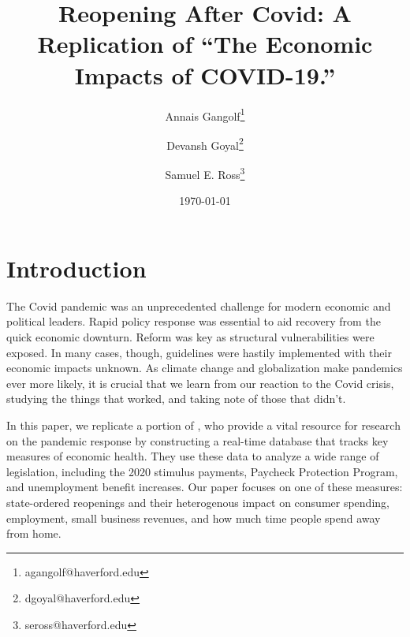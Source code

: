 \documentclass[12pt,letterpaper]{article}
\title{Reopening After Covid: A Replication of \authorcite{Chetty2020} ``The Economic Impacts of COVID-19.''}
\author[1]{Annais Gangolf\thanks{agangolf@haverford.edu}}
\author[1]{Devansh Goyal\thanks{dgoyal@haverford.edu}}
\author[1]{Samuel E. Ross\thanks{seross@haverford.edu}}
\affil[1]{Economics Research Club, Haverford College, Haverford, PA 19041, USA}
\date{\today}
\begin{document}
\maketitle

\abstract{
}

\section*{Introduction}
The Covid pandemic was an unprecedented challenge for modern economic and political leaders. Rapid policy response was essential to aid recovery from the quick economic downturn. Reform was key as structural vulnerabilities were exposed. In many cases, though, guidelines were hastily implemented with their economic impacts unknown. As climate change and globalization make pandemics ever more likely, it is crucial that we learn from our reaction to the Covid crisis, studying the things that worked, and taking note of those that didn’t.

In this paper, we replicate a portion of \textcite{Chetty2020}, who provide a vital resource for research on the pandemic response by constructing a real-time database that tracks key measures of economic health. They use these data to analyze a wide range of legislation, including the 2020 stimulus payments, Paycheck Protection Program, and unemployment benefit increases. Our paper focuses on one of these measures: state-ordered reopenings and their heterogenous impact on consumer spending, employment, small business revenues, and how much time people spend away from home. 
\end{document}
